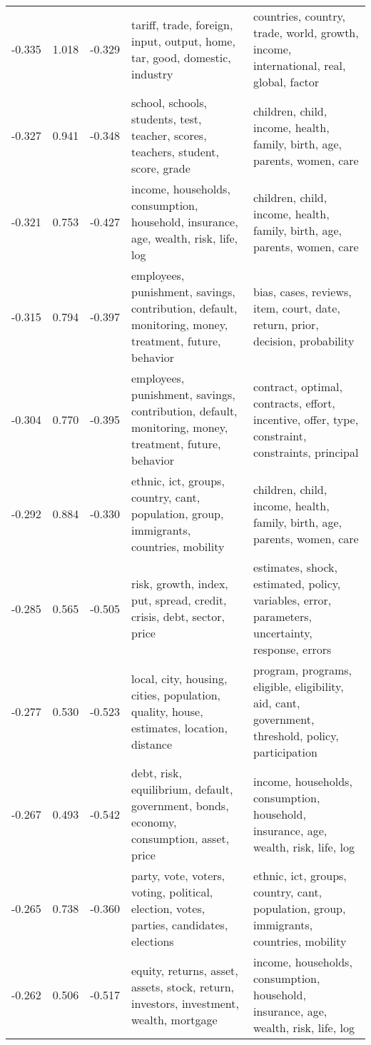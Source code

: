 \begin{tabular}{cccp{5cm}p{5cm}}
-0.335 & 1.018 & -0.329 & tariff, trade, foreign, input, output, home, tar, good, domestic, industry & countries, country, trade, world, growth, income, international, real, global, factor \\
-0.327 & 0.941 & -0.348 & school, schools, students, test, teacher, scores, teachers, student, score, grade & children, child, income, health, family, birth, age, parents, women, care \\
-0.321 & 0.753 & -0.427 & income, households, consumption, household, insurance, age, wealth, risk, life, log & children, child, income, health, family, birth, age, parents, women, care \\
-0.315 & 0.794 & -0.397 & employees, punishment, savings, contribution, default, monitoring, money, treatment, future, behavior & bias, cases, reviews, item, court, date, return, prior, decision, probability \\
-0.304 & 0.770 & -0.395 & employees, punishment, savings, contribution, default, monitoring, money, treatment, future, behavior & contract, optimal, contracts, effort, incentive, offer, type, constraint, constraints, principal \\
-0.292 & 0.884 & -0.330 & ethnic, ict, groups, country, cant, population, group, immigrants, countries, mobility & children, child, income, health, family, birth, age, parents, women, care \\
-0.285 & 0.565 & -0.505 & risk, growth, index, put, spread, credit, crisis, debt, sector, price & estimates, shock, estimated, policy, variables, error, parameters, uncertainty, response, errors \\
-0.277 & 0.530 & -0.523 & local, city, housing, cities, population, quality, house, estimates, location, distance & program, programs, eligible, eligibility, aid, cant, government, threshold, policy, participation \\
-0.267 & 0.493 & -0.542 & debt, risk, equilibrium, default, government, bonds, economy, consumption, asset, price & income, households, consumption, household, insurance, age, wealth, risk, life, log \\
-0.265 & 0.738 & -0.360 & party, vote, voters, voting, political, election, votes, parties, candidates, elections & ethnic, ict, groups, country, cant, population, group, immigrants, countries, mobility \\
-0.262 & 0.506 & -0.517 & equity, returns, asset, assets, stock, return, investors, investment, wealth, mortgage & income, households, consumption, household, insurance, age, wealth, risk, life, log \\

\end{tabular}
